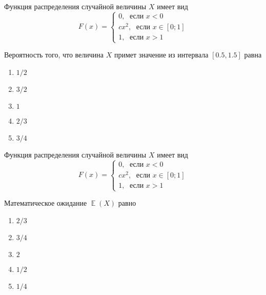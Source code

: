 \documentclass[t]{beamer}
\DeclareMathOperator{\E}{\mathbb{E}}
\begin{document}
 \begin{frame} \label{18} 
\begin{block}{18} 

Функция распределения случайной величины $X$ имеет вид
\[
F(x)=\begin{cases}
0, \; \text{ если } x<0 \\
cx^2, \; \text{ если } x\in [0;1] \\
1, \; \text{ если } x>1
\end{cases}
\]

\vspace{0.5cm} 
 
 
Вероятность того, что величина $X$ примет значение из интервала  $[0.5, 1.5]$ равна
 


 \end{block} 
\begin{enumerate} 
\item[] \hyperlink{18-No}{\beamergotobutton{} $1/2$}
\item[] \hyperlink{18-No}{\beamergotobutton{} $3/2$
}
\item[] \hyperlink{18-No}{\beamergotobutton{} $1$}
\item[] \hyperlink{18-No}{\beamergotobutton{} $2/3$}
\item[] \hyperlink{18-Yes}{\beamergotobutton{} $3/4$}
\end{enumerate} 
\end{frame} 


 \begin{frame} \label{19} 
\begin{block}{19} 

Функция распределения случайной величины $X$ имеет вид
\[
F(x)=\begin{cases}
0, \; \text{ если } x<0 \\
cx^2, \; \text{ если } x\in [0;1] \\
1, \; \text{ если } x>1
\end{cases}
\]

\vspace{0.5cm} 
 
 
Математическое ожидание $\E(X)$ равно
 


 \end{block} 
\begin{enumerate} 
\item[] \hyperlink{19-Yes}{\beamergotobutton{} $2/3$}
\item[] \hyperlink{19-No}{\beamergotobutton{} $3/4$}
\item[] \hyperlink{19-No}{\beamergotobutton{} $2$
}
\item[] \hyperlink{19-No}{\beamergotobutton{} $1/2$}
\item[] \hyperlink{19-No}{\beamergotobutton{} $1/4$}
\end{enumerate} 
\end{frame} 
\end{document}
